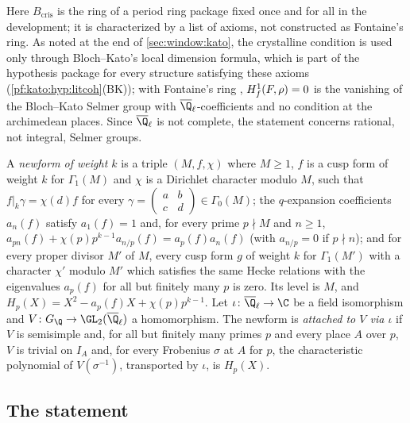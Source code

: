 \begin{remark}\label{pf:kato:rem:bcris}
Here $B_{\mathrm{cris}}$ is the ring of a period ring package fixed once and for all in the development; it is
characterized by a list of axioms, not constructed as Fontaine's ring. As noted at the end of
\cref{sec:window:kato}, the crystalline condition is used only through Bloch--Kato's local dimension formula,
which is part of the hypothesis package for every structure satisfying these axioms
(\cref{pf:kato:hyp:litcoh}(BK)); with Fontaine's ring \cite{Fontaine1994}, $H^1_{f}(F,\rho)=0$ is the
vanishing of the Bloch--Kato Selmer group \cite{BlochKato1990} with $\katoQlb$-coefficients and no condition
at the archimedean places. Since $\katoQlb$ is not complete, the statement concerns rational, not integral,
Selmer groups.
\end{remark}

\begin{definition}\label{pf:kato:def:newform}
A \emph{newform of weight $k$} is a triple $(M,f,\chi)$ where $M\ge1$, $f$ is a cusp form of weight $k$ for
$\Gamma_1(M)$ and $\chi$ is a Dirichlet character modulo $M$, such that $f|_k\gamma=\chi(d)f$ for every
$\gamma=\left(\begin{smallmatrix}a&b\\c&d\end{smallmatrix}\right)\in\Gamma_0(M)$; the $q$-expansion coefficients
$a_n(f)$ satisfy $a_1(f)=1$ and, for every prime $p\nmid M$ and $n\ge1$,
$a_{pn}(f)+\chi(p)p^{k-1}a_{n/p}(f)=a_p(f)a_n(f)$ (with $a_{n/p}=0$ if $p\nmid n$); and for every proper
divisor $M'$ of $M$, every cusp form $g$ of weight $k$ for $\Gamma_1(M')$ with a character $\chi'$ modulo $M'$
which satisfies the same Hecke relations with the eigenvalues $a_p(f)$ for all but finitely many $p$ is zero.
Its level is $M$, and $H_p(X)=X^2-a_p(f)X+\chi(p)p^{k-1}$. Let $\iota\colon\katoQlb\to\C$ be a field
isomorphism and $V\colon G_\Q\to\GL_2(\katoQlb)$ a homomorphism. The newform is \emph{attached to $V$ via
$\iota$} if $V$ is semisimple and, for all but finitely many primes $p$ and every place $A$ over $p$, $V$ is
trivial on $I_A$ and, for every Frobenius $\sigma$ at $A$ for $p$, the characteristic polynomial of
$V(\sigma^{-1})$, transported by $\iota$, is $H_p(X)$.
\end{definition}

\subsection{The statement}\label{pf:kato:sec:statement}

